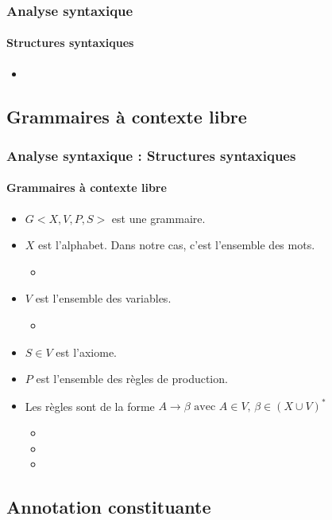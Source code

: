 \documentclass[xcolor=table]{beamer}
\begin{document}
\begin{frame}
\frametitle{Analyse syntaxique}
\framesubtitle{Structures syntaxiques}

\begin{itemize}
	\item 
\end{itemize}

\end{frame}

\subsection{Grammaires à contexte libre}

\begin{frame}
\frametitle{Analyse syntaxique : Structures syntaxiques}
\framesubtitle{Grammaires à contexte libre}

\begin{itemize}
	\item $G <X,V, P, S>$ est une grammaire.
	\item $X$ est l'alphabet. Dans notre cas, c'est l'ensemble des mots.
	\begin{itemize}
		\item {}
	\end{itemize}
	\item $V$ est l'ensemble des  variables.
	\begin{itemize}
		\item {}
	\end{itemize}
	\item $S \in V$ est l'axiome.
	\item $P$ est l'ensemble des règles de production.
	\item Les règles sont de la forme $A \rightarrow \beta \text{ avec } A \in V,\, \beta \in (X \cup V)^*$
	\begin{itemize}
		\item {}
		\item {}
		\item {}
	\end{itemize}
\end{itemize}

\end{frame}

\subsection{Annotation constituante}
\end{document}
